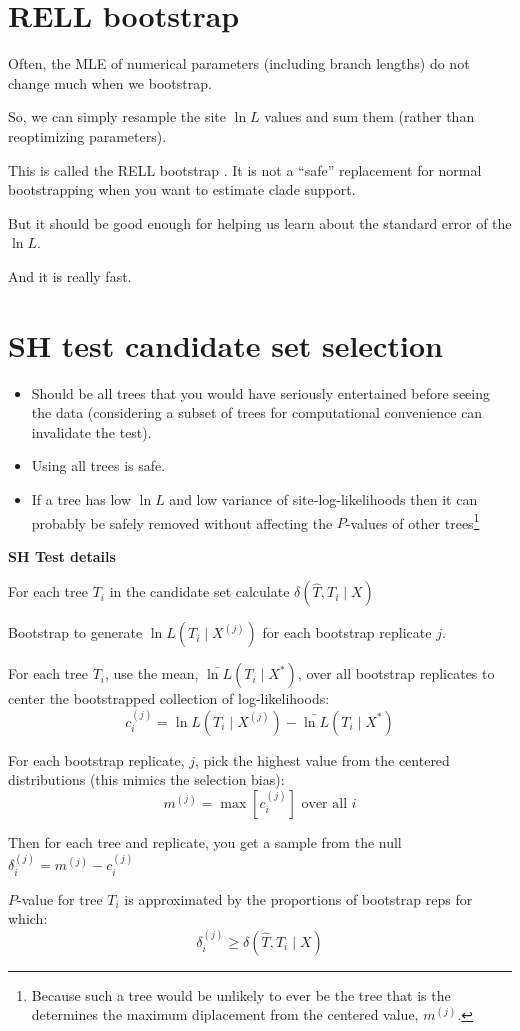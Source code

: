 \myNewSlide
\section*{RELL bootstrap}
\large
Often, the MLE of numerical parameters (including branch lengths) do not change much when we bootstrap.

So, we can simply resample the site $\ln L$ values and sum them (rather than reoptimizing parameters).

This is called the RELL bootstrap \citep[][and Felsenstein]{KishinoMH1990}. It is not a ``safe'' replacement for normal bootstrapping \citep[especially on large trees;][]{StamatakisHR2008} when you want to estimate clade support.

But it should be good enough for helping us learn about the standard error of the $\ln L$.

And it is really fast.




\myNewSlide
\section*{SH test candidate set selection}
\large
\begin{itemize}
    \item Should be all trees that you would have seriously entertained before seeing the data (considering a subset of trees for computational convenience can invalidate the test).
    \item Using all trees is safe.
    \item If a tree has low $\ln L$ and low variance of site-log-likelihoods then it can probably be safely removed without affecting the $P$-values of other trees\footnote{Because such a tree would be unlikely to ever be the tree that is the determines the maximum diplacement from the centered value, $m^{(j)}$.}
\end{itemize}

\myNewSlide
{\bf SH Test details}
\normalsize
\begin{compactitem}
    \item For each tree $T_i$ in the candidate set calculate $\delta(\hat{T}, T_i \mid X)$
    \item Bootstrap to generate ${\ln L}(T_i \mid X^{(j)})$ for each bootstrap replicate $j$.
    \item For each tree $T_i$, use the mean, $\bar{\ln L}(T_i \mid X^{\ast})$, over all bootstrap replicates to center the bootstrapped collection of log-likelihoods:
        $$c_i^{(j)} = {\ln L}(T_i \mid X^{(j)})-\bar{\ln L}(T_i \mid X^{\ast})$$
    \item For each bootstrap replicate, $j$, pick the highest value from the centered distributions (this mimics the selection bias): $$m^{(j)} = \max\left[c_i^{(j)}\right] \mbox{ over all } i$$
    \item Then for each tree and replicate, you get a sample from the null $\delta_i^{(j)} = m^{(j)} - c_i^{(j)}$
    \item $P$-value for tree $T_i$ is approximated by the proportions of bootstrap reps for which: $$\delta_i^{(j)} \geq \delta(\hat{T}, T_i \mid X)$$
\end{compactitem}


